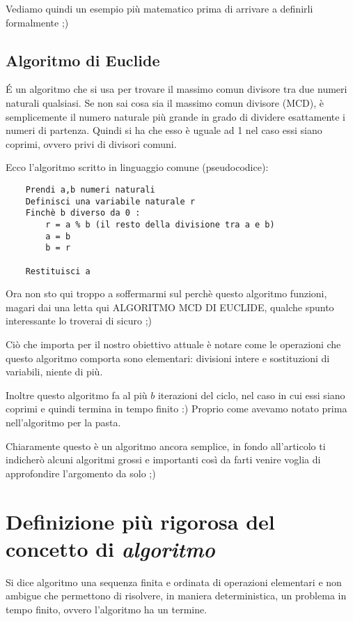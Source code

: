 Vediamo quindi un esempio più matematico prima di arrivare a definirli formalmente ;)

\subsection*{Algoritmo di Euclide}

É un algoritmo che si usa per trovare il massimo comun divisore tra due numeri naturali qualsiasi. Se non sai cosa sia il massimo comun divisore (MCD), è semplicemente il numero naturale più grande in grado di dividere esattamente i numeri di partenza. Quindi si ha che esso è uguale ad 1 nel caso essi siano coprimi, ovvero privi di divisori comuni.

Ecco l'algoritmo scritto in linguaggio comune (pseudocodice):

\begin{verbatim}
	Prendi a,b numeri naturali
	Definisci una variabile naturale r
	Finchè b diverso da 0 :
		r = a % b (il resto della divisione tra a e b)
		a = b
		b = r 
	
	Restituisci a
\end{verbatim}

Ora non sto qui troppo a soffermarmi sul perchè questo algoritmo funzioni, magari dai una letta qui ALGORITMO MCD DI EUCLIDE, qualche spunto interessante lo troverai di sicuro ;)

Ciò che importa  per il nostro obiettivo attuale è notare come le operazioni che questo algoritmo comporta sono elementari: divisioni intere e sostituzioni di variabili, niente di più.

Inoltre questo algoritmo fa al più $ b $ iterazioni del ciclo, nel caso in cui essi siano coprimi e quindi termina in tempo finito :) Proprio come avevamo notato prima nell'algoritmo per la pasta.

Chiaramente questo è un algoritmo ancora semplice, in fondo all'articolo ti indicherò alcuni algoritmi grossi e importanti così da farti venire voglia di approfondire l'argomento da solo ;)

\section{Definizione più rigorosa del concetto di \textit{algoritmo}}

\begin{defn}
	Si dice algoritmo una sequenza finita e ordinata di operazioni elementari e non ambigue che permettono di risolvere, in maniera deterministica, un problema in tempo finito, ovvero l'algoritmo ha un termine.
\end{defn}

